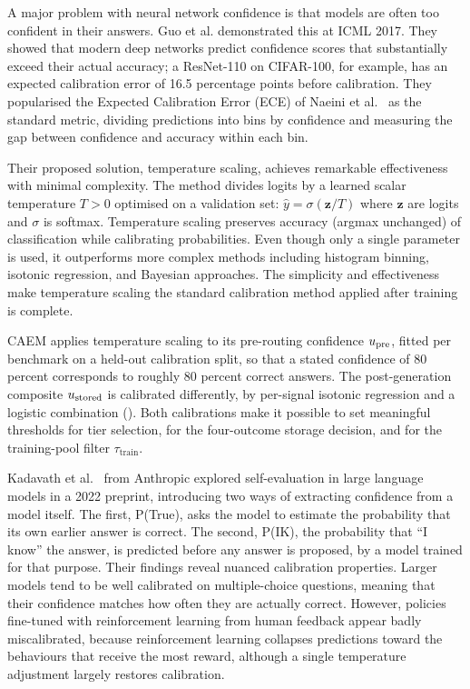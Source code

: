 A major problem with neural network confidence is that models are often too confident in their answers. Guo et al. \cite{pmlr-v70-guo17a} demonstrated this at ICML 2017. They showed that modern deep networks predict confidence scores that substantially exceed their actual accuracy; a ResNet-110 on CIFAR-100, for example, has an expected calibration error of 16.5 percentage points before calibration. They popularised the Expected Calibration Error (ECE) of Naeini et al.~\cite{naeini2015obtaining} as the standard metric, dividing predictions into bins by confidence and measuring the gap between confidence and accuracy within each bin.

Their proposed solution, temperature scaling, achieves remarkable effectiveness with minimal complexity. The method divides logits by a learned scalar temperature $T > 0$ optimised on a validation set: $\hat{y} = \sigma(\mathbf{z}/T)$ where $\mathbf{z}$ are logits and $\sigma$ is softmax. Temperature scaling preserves accuracy (argmax unchanged) of classification while calibrating probabilities. Even though only a single parameter is used, it outperforms more complex methods including histogram binning, isotonic regression, and Bayesian approaches. The simplicity and effectiveness make temperature scaling the standard calibration method applied after training is complete.

CAEM applies temperature scaling to its pre-routing confidence $u_{\text{pre}}$, fitted per benchmark on a held-out calibration split, so that a stated confidence of $80$ percent corresponds to roughly $80$ percent correct answers. The post-generation composite $u_{\text{stored}}$ is calibrated differently, by per-signal isotonic regression and a logistic combination (). Both calibrations make it possible to set meaningful thresholds for tier selection, for the four-outcome storage decision, and for the training-pool filter $\tau_{\text{train}}$.

Kadavath et al.\ \cite{kadavath2022language} from Anthropic explored self-evaluation in large language models in a 2022 preprint, introducing two ways of extracting confidence from a model itself. The first, P(True), asks the model to estimate the probability that its own earlier answer is correct. The second, P(IK), the probability that ``I know'' the answer, is predicted before any answer is proposed, by a model trained for that purpose. Their findings reveal nuanced calibration properties. Larger models tend to be well calibrated on multiple-choice questions, meaning that their confidence matches how often they are actually correct. However, policies fine-tuned with reinforcement learning from human feedback appear badly miscalibrated, because reinforcement learning collapses predictions toward the behaviours that receive the most reward, although a single temperature adjustment largely restores calibration.

